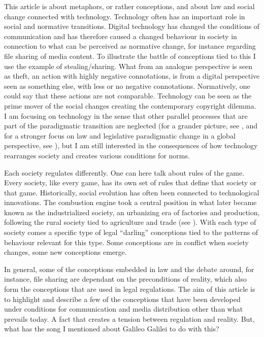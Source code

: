 This article is about metaphors, or rather conceptions, and about law and social
change connected with technology. Technology often has an important role in
social and normative transitions\cite{darling-vago09}. Digital technology has
changed the conditions of communication and has therefore caused a changed
behaviour in society in connection to what can be perceived as normative change,
for instance regarding f\hbox{}ile sharing of media content. To illustrate the battle
of conceptions tied to this I use the example of stealing/sharing. What from an
analogue perspective is seen as theft, an action with highly negative
connotations, is from a digital perspective seen as something else, with less or
no negative connotations. Normatively, one could say that these actions are not
comparable. Technology can be seen as the prime mover of the social changes
creating the contemporary copyright dilemma. I am focusing on technology in the
sense that other parallel processes that are part of the paradigmatic transition
are neglected (for a grander picture, see \cite{darling-castells96,
darling-castells97, darling-castells98}, and for a stronger focus on law and
legislative paradigmatic change in a global perspective, see
\cite{darling-santos95a, darling-santos95b}), but I am still interested in the
consequences of how technology rearranges society and creates various conditions
for norms. 

Each society regulates dif\hbox{}ferently. One can here talk about rules of the game.
Every society, like every game, has its own set of rules that def\hbox{}ine that
society or that game. Historically, social evolution has often been connected to
technological innovations. The combustion engine took a central position in what
later became known as the industrialized society, an urbanizing era of factories
and production, following the rural society tied to agriculture and trade (see
\cite{darling-fridholm84, darling-sundqvist01, darling-ewerman_hyden97}). With
each type of society comes a specif\hbox{}ic type of legal ``darling'' conceptions tied
to the patterns of behaviour relevant for this type. Some conceptions are in
conf\hbox{}lict when society changes, some new conceptions emerge. 

In general, some of the conceptions embedded in law and the debate around, for
instance, f\hbox{}ile sharing are dependant on the preconditions of reality, which also
form the conceptions that are used in legal regulations. The aim of this article
is to highlight and describe a few of the conceptions that have been developed
under conditions for communication and media distribution other than what
prevails today. A fact that creates a tension between regulation and reality.
But, what has the song I mentioned about Galileo Galilei to do with this?


